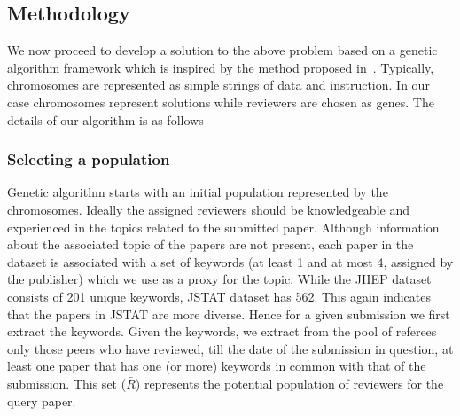 \subsection{Methodology}
We now proceed to develop a solution to the above problem based on a genetic algorithm framework which is inspired by the method proposed in~\cite{ani2010method}. 
Typically, chromosomes are represented as simple
strings of data and instruction. In our case chromosomes represent solutions while reviewers are chosen as genes. The details of our algorithm is as follows -- 
\subsubsection{Selecting a population} Genetic algorithm starts with an initial population represented by the chromosomes. 
Ideally the assigned reviewers should be knowledgeable and experienced in the topics related to the submitted paper. Although information about the associated topic of the papers are not present, each paper in the dataset is  associated with a set of keywords (at least 1 and at most 4, assigned by the publisher) which we use as a proxy for the topic. While the JHEP dataset consists of 201 unique keywords, JSTAT dataset has 562. This again indicates that the papers in JSTAT are more diverse. 
Hence for  a given 
submission we first extract the keywords. 
Given the keywords, we extract from the pool of referees only those peers who have reviewed, till the date of the submission in question, at least one paper 
that has one (or more) keywords in common with that of the submission. This set ($\bar R$) represents the potential population of reviewers for the query paper.



